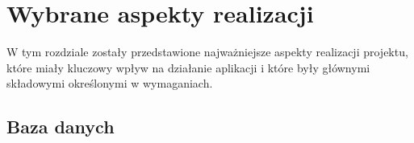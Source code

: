 %
%
%


\chapter{Wybrane aspekty realizacji}
\label{cha:3}

W tym rozdziale zostały przedstawione najważniejsze aspekty realizacji projektu, które miały kluczowy wpływ na działanie aplikacji i które były głównymi składowymi określonymi w wymaganiach.

\section{Baza danych}
\label{sec:3.1}

